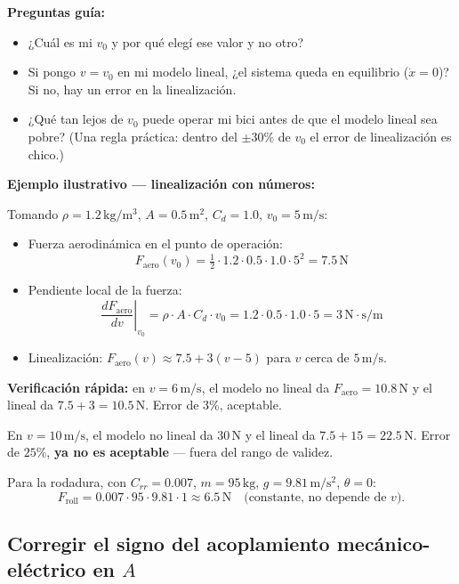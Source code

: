 \documentclass[11pt,a4paper]{article}
\newcommand{\unit}[1]{\,\mathrm{#1}}
\begin{document}
\begin{guia}
\textbf{Preguntas guía:}
\begin{itemize}
    \item ¿Cuál es mi $v_0$ y por qué elegí ese valor y no otro?
    \item Si pongo $v = v_0$ en mi modelo lineal, ¿el sistema queda en equilibrio ($\dot{x}=0$)? Si no, hay un error en la linealización.
    \item ¿Qué tan lejos de $v_0$ puede operar mi bici antes de que el modelo lineal sea pobre? (Una regla práctica: dentro del $\pm 30\%$ de $v_0$ el error de linealización es chico.)
\end{itemize}
\end{guia}

\begin{ejemplo}
\textbf{Ejemplo ilustrativo --- linealización con números:}

Tomando $\rho = 1.2\unit{kg/m^3}$, $A = 0.5\unit{m^2}$, $C_d = 1.0$, $v_0 = 5\unit{m/s}$:

\begin{itemize}
    \item Fuerza aerodinámica en el punto de operación:
    \[ F_{\text{aero}}(v_0) = \tfrac{1}{2} \cdot 1.2 \cdot 0.5 \cdot 1.0 \cdot 5^2 = 7.5\unit{N} \]
    \item Pendiente local de la fuerza:
    \[ \left.\frac{dF_{\text{aero}}}{dv}\right|_{v_0} = \rho \cdot A \cdot C_d \cdot v_0 = 1.2 \cdot 0.5 \cdot 1.0 \cdot 5 = 3\unit{N\cdot s/m} \]
    \item Linealización: $F_{\text{aero}}(v) \approx 7.5 + 3(v-5)$ para $v$ cerca de $5\unit{m/s}$.
\end{itemize}

\textbf{Verificación rápida:} en $v = 6\unit{m/s}$, el modelo no lineal da $F_{\text{aero}} = 10.8\unit{N}$ y el lineal da $7.5 + 3 = 10.5\unit{N}$. Error de $3\%$, aceptable.

En $v = 10\unit{m/s}$, el modelo no lineal da $30\unit{N}$ y el lineal da $7.5 + 15 = 22.5\unit{N}$. Error de $25\%$, \textbf{ya no es aceptable} --- fuera del rango de validez.

Para la rodadura, con $C_{rr} = 0.007$, $m = 95\unit{kg}$, $g = 9.81\unit{m/s^2}$, $\theta = 0$:
\[ F_{\text{roll}} = 0.007 \cdot 95 \cdot 9.81 \cdot 1 \approx 6.5\unit{N} \quad \text{(constante, no depende de }v\text{).} \]
\end{ejemplo}

\subsection{Corregir el signo del acoplamiento mecánico-eléctrico en \texorpdfstring{$A$}{A}}
\end{document}
